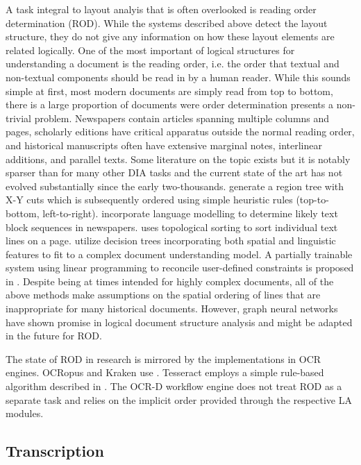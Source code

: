 A task integral to layout analyis that is often overlooked is reading order
determination (ROD). While the systems described above detect the layout
structure, they do not give any information on how these layout elements are
related logically. One of the most important of logical structures for
understanding a document is the reading order, i.e. the order that textual and
non-textual components should be read in by a human reader. While this sounds
simple at first, most modern documents are simply read from top to bottom,
there is a large proportion of documents were order determination presents a
non-trivial problem. Newspapers contain articles spanning multiple columns and
pages, scholarly editions have critical apparatus outside the normal reading
order, and historical manuscripts often have extensive marginal notes,
interlinear additions, and parallel texts.  Some literature on the topic exists
but it is notably sparser than for many other DIA tasks and the current state
of the art has not evolved substantially since the early two-thousands.
\cite{nagy1984hierarchical,ishitani2003document,meunier2005optimized} generate
a region tree with X-Y cuts which is subsequently ordered using simple
heuristic rules (top-to-bottom, left-to-right). \cite{Gao} incorporate language
modelling to determine likely text block sequences in newspapers.
\cite{Breuel03highperformance} uses topological sorting to sort individual text
lines on a page. \cite{AielloIJDAR2002} utilize decision trees incorporating
both spatial and linguistic features to fit to a complex document understanding
model. A partially trainable system using linear programming to reconcile
user-defined constraints is proposed in \cite{malerba2008machine}. Despite being at
times intended for highly complex documents, all of the above methods make
assumptions on the spatial ordering of lines that are inappropriate for many
historical documents. However, graph neural networks have shown promise in
logical document structure analysis\cite{dejean2019versatile} and might be
adapted in the future for ROD.

The state of ROD in research is mirrored by the implementations in OCR engines.
OCRopus and Kraken use \cite{Breuel03highperformance}. Tesseract employs a
simple rule-based algorithm described in \cite{5277715}. The OCR-D workflow
engine does not treat ROD as a separate task and relies on the implicit order
provided through the respective LA modules.

\subsection{Transcription}

